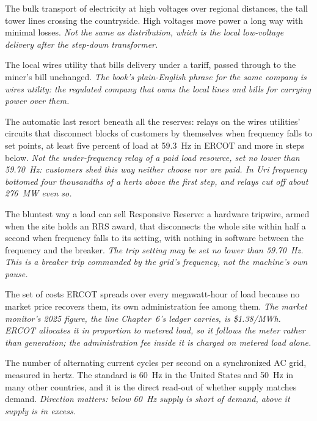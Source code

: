 \begin{description}[leftmargin=0pt,style=unboxed,itemsep=0.35em,parsep=0.15em]
\item[transmission] \hypertarget{glossary:transmission}{}The bulk transport of electricity at high voltages over regional distances, the tall tower lines crossing the countryside. High voltages move power a long way with minimal losses. \emph{Not the same as distribution, which is the local low-voltage delivery after the step-down transformer.}
\item[transmission and distribution utility (TDU)] \hypertarget{glossary:transmission-and-distribution-utility}{}The local wires utility that bills delivery under a tariff, passed through to the miner's bill unchanged. \emph{The book's plain-English phrase for the same company is wires utility: the regulated company that owns the local lines and bills for carrying power over them.}
\item[under-frequency load shedding (UFLS)] \hypertarget{glossary:under-frequency-load-shedding}{}The automatic last resort beneath all the reserves: relays on the wires utilities' circuits that disconnect blocks of customers by themselves when frequency falls to set points, at least five percent of load at 59.3~Hz in ERCOT and more in steps below. \emph{Not the under-frequency relay of a paid load resource, set no lower than 59.70~Hz: customers shed this way neither choose nor are paid. In Uri frequency bottomed four thousandths of a hertz above the first step, and relays cut off about 276~MW even so.}
\item[under-frequency relay (UFR)] \hypertarget{glossary:under-frequency-relay}{}The bluntest way a load can sell Responsive Reserve: a hardware tripwire, armed when the site holds an RRS award, that disconnects the whole site within half a second when frequency falls to its setting, with nothing in software between the frequency and the breaker. \emph{The trip setting may be set no lower than 59.70~Hz. This is a breaker trip commanded by the grid's frequency, not the machine's own pause.}
\item[uplift] \hypertarget{glossary:uplift}{}The set of costs ERCOT spreads over every megawatt-hour of load because no market price recovers them, its own administration fee among them. \emph{The market monitor's 2025 figure, the line Chapter~6's ledger carries, is \$1.38/MWh. ERCOT allocates it in proportion to metered load, so it follows the meter rather than generation; the administration fee inside it is charged on metered load alone.}
\item[utility frequency (Hz)] \hypertarget{glossary:utility-frequency}{}The number of alternating current cycles per second on a synchronized AC grid, measured in hertz. The standard is 60~Hz in the United States and 50~Hz in many other countries, and it is the direct read-out of whether supply matches demand. \emph{Direction matters: below 60~Hz supply is short of demand, above it supply is in excess.}

\end{description}
